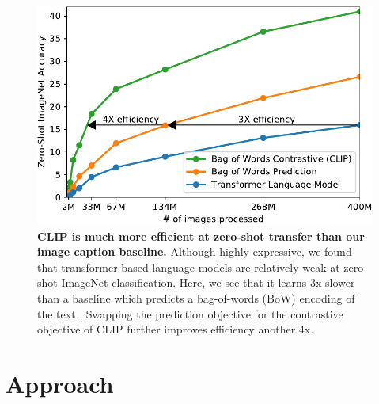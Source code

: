 \documentclass{article}
\begin{document}
\begin{figure}[t]
\begin{center}
\centerline{\includegraphics[width=1.0\columnwidth]{efficiency-ablation}}
\caption{\textbf{CLIP is much more efficient at zero-shot transfer than our image caption baseline.} Although highly expressive, we found that transformer-based language models are relatively weak at zero-shot ImageNet classification. Here, we see that it learns 3x slower than a baseline which predicts a bag-of-words (BoW) encoding of the text \citep{joulin2016learning}. Swapping the prediction objective for the contrastive objective of CLIP further improves efficiency another 4x.}
\label{compare_objective_fig}
\end{center}
\vspace{-1em}
\end{figure}

\section{Approach}
\end{document}
